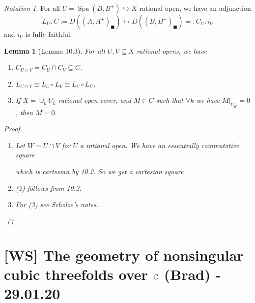 \documentclass[A4paper, british, reqno]{amsart}
\theoremstyle{darkgreentheorem}
\newtheorem{lm}[thm]{Lemma}
\theoremstyle{darkbluedefinition}
\theoremstyle{darkredexample}
\theoremstyle{remark}
\newtheorem{nota}[thm]{Notation}
\DeclareMathOperator{\Spa}{Spa}
\newcommand{\1}{\mathbbm{1}}
\newcommand{\sub}{\subseteq}
\newcommand{\mono}{\hookrightarrow}
\newcommand{\usolid}{_{\blacksquare}}
\begin{document}
\begin{nota}
    For all $U=\Spa(B,B^{+})\mono X$ rational open, we have an adjunction
    \[ L_{U}\colon C:= D((A,A^{+})\usolid)\leftrightarrow D((B,B^{+})\usolid)=:C_{U}\colon i_{U} \]
    and $i_{U}$ is fully faithful.
\end{nota}

\begin{lm}[Lemma 10.3]
    For all $U,V\sub X$ rational opens, we have
    \begin{enumerate}
	\item $C_{U\cap V}=C_{U}\cap C_{V}\sub C$.
	\item $L_{U\cap V}\cong L_{U}\circ L_{V}\cong L_{V}\circ L_{U}$.
	\item If $X=\cup_{k} U_{k}$ rational open cover, and $M\in C$ such that $\forall k$ we hace $M|_{U_{K}}=0$, then $M=0$.
    \end{enumerate}
    \begin{proof}
	\begin{enumerate}
	     \item Let $W=U\cap V$ for $U$ a rational open.
		We have an essentially commutative square
		\begin{center}
		\end{center}
		which is cartesian by 10.2.
		So we get a cartesian square
		\begin{center}
		\end{center}
	    \item (2) follows from 10.2.
	    \item For (3) see Scholze's notes.
	\end{enumerate}
    \end{proof}
\end{lm}

\section{[WS] The geometry of nonsingular cubic threefolds over $\mathbb{C}$ (Brad) - 29.01.20}
\end{document}

